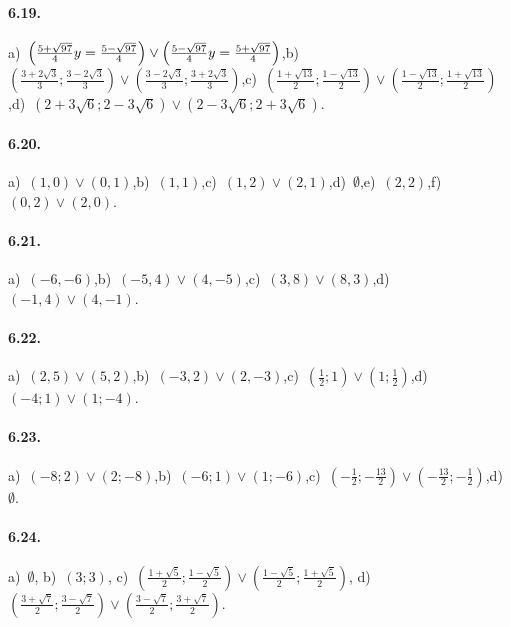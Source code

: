 \paragraph{6.19.} a)~$\left(\frac{5+\sqrt{97}} 4\\y=\frac{5-\sqrt{97}} 4\right)\vee \left(\frac{5-\sqrt{97}} 4\\y=\frac{5+\sqrt{97}} 4\right)$,\quad b)~$\left(\frac{3+{2\sqrt 3}} 3;\frac {3-{2\sqrt 3}} 3\right)\vee \left(\frac {3-{2\sqrt 3}} 3;\frac{3+{2\sqrt 3}} 3\right)$,\quad c)~$\left(\frac{1+\sqrt{13}} 2;\frac{1-\sqrt{13}} 2\right)\vee \left(\frac{1-\sqrt{13}} 2;\frac{1+\sqrt{13}} 2\right)$,\quad d)~$\left(2+3\sqrt 6;2-3\sqrt 6\right)\vee \left(2-3\sqrt 6;2+3\sqrt 6\right)$.

\paragraph{6.20.} a)~$(1,0)\vee(0,1)$,\quad b)~$(1,1)$,\quad c)~$(1,2)\vee(2,1)$,\quad d)~$\emptyset$,\quad e)~$(2,2)$,\quad f)~$(0,2)\vee(2,0)$.

\paragraph{6.21.} a)~$(-6,-6)$,\quad b)~$(-5,4)\vee(4,-5)$,\quad c)~$(3,8)\vee(8,3)$,\quad d)~$(-1,4)\vee(4,-1)$.

\paragraph{6.22.} a)~$(2,5)\vee(5,2)$,\quad b)~$(-3,2)\vee(2,-3)$,\quad c)~$(\frac 1 2;1)\vee(1;\frac 1 2)$,\quad d)~$(-4;1)\vee(1;-4)$.

\paragraph{6.23.} a)~$(-8;2)\vee(2;-8)$,\quad b)~$(-6;1)\vee(1;-6)$,\quad c)~$\left(-\frac 1 2;-\frac{13} 2\right)\vee \left(-\frac{13} 2;-\frac 1 2\right)$,\quad d)~$\emptyset $.

\paragraph{6.24.} a)~$\emptyset $,\; b)~$(3;3)$,\; c)~$\left(\frac{1+\sqrt 5} 2;\frac{1-\sqrt 5} 2\right)\vee \left(\frac{1-\sqrt 5} 2;\frac{1+\sqrt 5} 2\right)$,\; d)~$\left(\frac{3+\sqrt 7} 2;\frac{3-\sqrt 7} 2\right)\vee \left(\frac{3-\sqrt 7} 2;\frac{3+\sqrt 7} 2\right)$.

